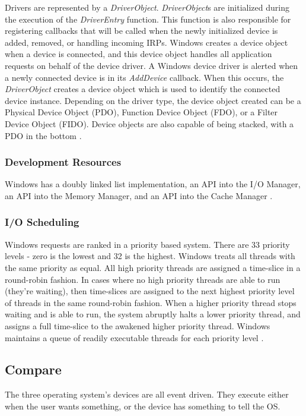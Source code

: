 \documentclass[onecolumn,draftclsnofoot, 10pt, compsoc]{IEEEtran}
\begin{document}
			Drivers are represented by a \textit{DriverObject}.
			\textit{DriverObject}s are initialized during the execution of the \textit{DriverEntry} function. 
			This function is also responsible for registering callbacks that will be called when the newly initialized device is added, removed, or handling incoming IRPs. 
			Windows creates a device object when a device is connected, and this device object handles all application requests on behalf of the device driver.
			A Windows device driver is alerted when a newly connected device is in its \textit{AddDevice} callback.
			When this occurs, the \textit{DriverObject} creates a device object which is used to identify the connected device instance. 
			Depending on the driver type, the device object created can be a Physical Device Object (PDO), Function Device Object (FDO), or a Filter Device Object (FIDO). 
			Device objects are also capable of being stacked, with a PDO in the bottom \cite{windowsDevs}.
	
		\subsubsection{Development Resources}
			Windows has a doubly linked list implementation, an API into the I/O Manager, an API into the Memory Manager, and an API into the Cache Manager \cite{windowsResources}.
	
		\subsubsection{I/O Scheduling}
			Windows requests are ranked in a priority based system. 
			There are 33 priority levels - zero is the lowest and 32 is the highest. 
			Windows treats all threads with the same priority as equal.
			All high priority threads are assigned a time-slice in a round-robin fashion. 
			In cases where no high priority threads are able to run (they're waiting), then time-slices are assigned to the next highest priority level of threads in the same round-robin fashion.
			When a higher priority thread stops waiting and is able to run, the system abruptly halts a lower priority thread, and assigns a full time-slice to the awakened higher priority thread.
			Windows maintains a queue of readily executable threads for each priority level \cite{windowsSched}.
	
	
	\subsection{Compare}
		The three operating system's devices are all event driven. 
		They execute either when the user wants something, or the device has something to tell the OS.
		
\end{document}
